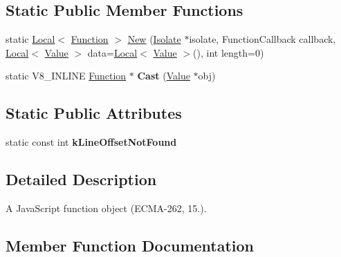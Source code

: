 \subsection*{Static Public Member Functions}
\begin{DoxyCompactItemize}
\item 
static \hyperlink{classv8_1_1_local}{Local}$<$ \hyperlink{classv8_1_1_function}{Function} $>$ \hyperlink{classv8_1_1_function_a56e303d1019aaa7954de668aee8486f7}{New} (\hyperlink{classv8_1_1_isolate}{Isolate} $\ast$isolate, Function\+Callback callback, \hyperlink{classv8_1_1_local}{Local}$<$ \hyperlink{classv8_1_1_value}{Value} $>$ data=\hyperlink{classv8_1_1_local}{Local}$<$ \hyperlink{classv8_1_1_value}{Value} $>$(), int length=0)
\item 
\hypertarget{classv8_1_1_function_af24f38bcc0769519816cda1f6a154ff8}{}static V8\+\_\+\+I\+N\+L\+I\+N\+E \hyperlink{classv8_1_1_function}{Function} $\ast$ {\bfseries Cast} (\hyperlink{classv8_1_1_value}{Value} $\ast$obj)\label{classv8_1_1_function_af24f38bcc0769519816cda1f6a154ff8}

\end{DoxyCompactItemize}
\subsection*{Static Public Attributes}
\begin{DoxyCompactItemize}
\item 
\hypertarget{classv8_1_1_function_acf0af24f79908e405a6ac435277596d9}{}static const int {\bfseries k\+Line\+Offset\+Not\+Found}\label{classv8_1_1_function_acf0af24f79908e405a6ac435277596d9}

\end{DoxyCompactItemize}


\subsection{Detailed Description}
A Java\+Script function object (E\+C\+M\+A-\/262, 15.). 

\subsection{Member Function Documentation}
\hypertarget{classv8_1_1_function_a937dc089e1ef728eec4a628072250e4d}{}
